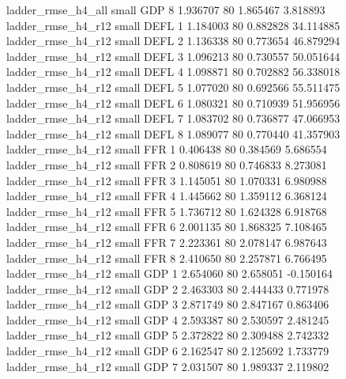       ladder_rmse_h4_all      small      GDP                 8 1.936707 80       1.865467           3.818893
      ladder_rmse_h4_r12      small     DEFL                 1 1.184003 80       0.882828          34.114885
      ladder_rmse_h4_r12      small     DEFL                 2 1.136338 80       0.773654          46.879294
      ladder_rmse_h4_r12      small     DEFL                 3 1.096213 80       0.730557          50.051644
      ladder_rmse_h4_r12      small     DEFL                 4 1.098871 80       0.702882          56.338018
      ladder_rmse_h4_r12      small     DEFL                 5 1.077020 80       0.692566          55.511475
      ladder_rmse_h4_r12      small     DEFL                 6 1.080321 80       0.710939          51.956956
      ladder_rmse_h4_r12      small     DEFL                 7 1.083702 80       0.736877          47.066953
      ladder_rmse_h4_r12      small     DEFL                 8 1.089077 80       0.770440          41.357903
      ladder_rmse_h4_r12      small      FFR                 1 0.406438 80       0.384569           5.686554
      ladder_rmse_h4_r12      small      FFR                 2 0.808619 80       0.746833           8.273081
      ladder_rmse_h4_r12      small      FFR                 3 1.145051 80       1.070331           6.980988
      ladder_rmse_h4_r12      small      FFR                 4 1.445662 80       1.359112           6.368124
      ladder_rmse_h4_r12      small      FFR                 5 1.736712 80       1.624328           6.918768
      ladder_rmse_h4_r12      small      FFR                 6 2.001135 80       1.868325           7.108465
      ladder_rmse_h4_r12      small      FFR                 7 2.223361 80       2.078147           6.987643
      ladder_rmse_h4_r12      small      FFR                 8 2.410650 80       2.257871           6.766495
      ladder_rmse_h4_r12      small      GDP                 1 2.654060 80       2.658051          -0.150164
      ladder_rmse_h4_r12      small      GDP                 2 2.463303 80       2.444433           0.771978
      ladder_rmse_h4_r12      small      GDP                 3 2.871749 80       2.847167           0.863406
      ladder_rmse_h4_r12      small      GDP                 4 2.593387 80       2.530597           2.481245
      ladder_rmse_h4_r12      small      GDP                 5 2.372822 80       2.309488           2.742332
      ladder_rmse_h4_r12      small      GDP                 6 2.162547 80       2.125692           1.733779
      ladder_rmse_h4_r12      small      GDP                 7 2.031507 80       1.989337           2.119802
